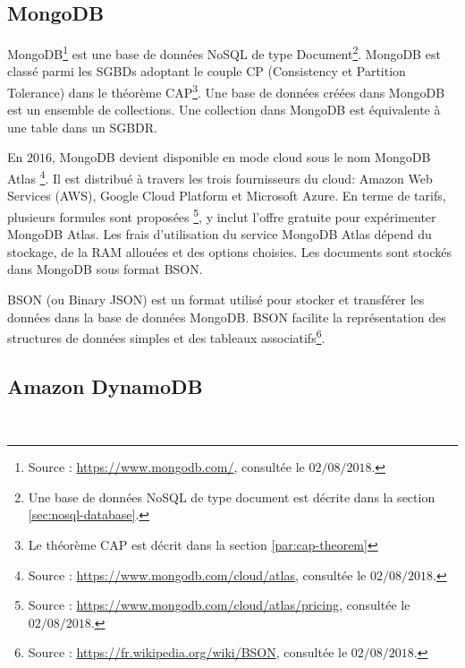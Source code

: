 	\subsection{MongoDB} \label{subsubsection:mongodb}
	
	
	
	MongoDB\footnote{Source : \url{https://www.mongodb.com/}, consultée le $02/08/2018$.} est une base de données  NoSQL de type Document\footnote{Une base de données NoSQL de type document est décrite dans la section \ref{sec:nosql-database}.}.  MongoDB est classé parmi les  SGBDs adoptant le couple CP (Consistency et Partition Tolerance) dans le théorème  CAP\footnote{Le théorème  CAP est décrit dans la section \ref{par:cap-theorem}}. Une base de données créées dans MongoDB est un ensemble de collections. Une collection dans MongoDB est équivalente à une table dans un SGBDR.
	
	En $ 2016 $, MongoDB devient disponible en mode cloud sous le nom  MongoDB Atlas \footnote{Source : \url{https://www.mongodb.com/cloud/atlas}, consultée le $ 02/08/2018 $.}.  Il est distribué à travers les trois fournisseurs du cloud: Amazon Web Services (AWS), Google Cloud Platform et Microsoft Azure.  En terme de tarifs, plusieurs formules sont proposées \footnote{Source : \url{https://www.mongodb.com/cloud/atlas/pricing}, consultée le $ 02/08/2018 $.}, y inclut l'offre gratuite pour expérimenter MongoDB Atlas.  Les frais d'utilisation du service MongoDB Atlas dépend du stockage, de la  RAM allouées et des options choisies. Les documents sont stockés dans MongoDB sous format BSON.
	
	 \begin{tcolorbox}
		BSON (ou Binary JSON) est un format utilisé pour stocker et transférer les données dans la base de données MongoDB. BSON facilite la représentation des structures de données simples et des tableaux associatifs\footnote{Source : \url{https://fr.wikipedia.org/wiki/BSON}, consultée le $ 02/08/2018 $.}.
	\end{tcolorbox}
	
	\subsection{Amazon DynamoDB}\label{aws:dynmo}~
	
